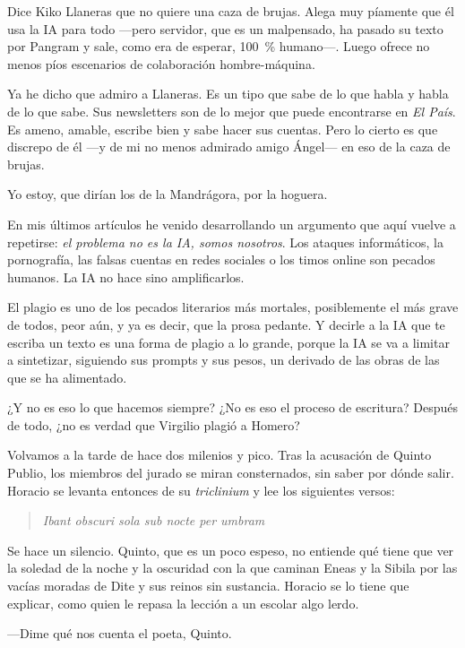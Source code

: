 \documentclass[11pt,a4paper]{article}
\begin{document}
Dice Kiko Llaneras que no quiere una caza de brujas. Alega muy píamente que él usa la IA para todo ---pero servidor, que es un malpensado, ha pasado su texto por Pangram y sale, como era de esperar, 100~\% humano---. Luego ofrece no menos píos escenarios de colaboración hombre-máquina.

Ya he dicho que admiro a Llaneras. Es un tipo que sabe de lo que habla y habla de lo que sabe. Sus newsletters son de lo mejor que puede encontrarse en \emph{El País}. Es ameno, amable, escribe bien y sabe hacer sus cuentas. Pero lo cierto es que discrepo de él ---y de mi no menos admirado amigo Ángel--- en eso de la caza de brujas.

Yo estoy, que dirían los de la Mandrágora, por la hoguera.

En mis últimos artículos he venido desarrollando un argumento que aquí vuelve a repetirse: \emph{el problema no es la IA, somos nosotros}. Los ataques informáticos, la pornografía, las falsas cuentas en redes sociales o los timos online son pecados humanos. La IA no hace sino amplificarlos.

El plagio es uno de los pecados literarios más mortales, posiblemente el más grave de todos, peor aún, y ya es decir, que la prosa pedante. Y decirle a la IA que te escriba un texto es una forma de plagio a lo grande, porque la IA se va a limitar a sintetizar, siguiendo sus prompts y sus pesos, un derivado de las obras de las que se ha alimentado.

¿Y no es eso lo que hacemos siempre? ¿No es eso el proceso de escritura? Después de todo, ¿no es verdad que Virgilio plagió a Homero?

Volvamos a la tarde de hace dos milenios y pico. Tras la acusación de Quinto Publio, los miembros del jurado se miran consternados, sin saber por dónde salir. Horacio se levanta entonces de su \emph{triclinium} y lee los siguientes versos:

\begin{verse}
\emph{Ibant obscuri sola sub nocte per umbram}
\end{verse}

Se hace un silencio. Quinto, que es un poco espeso, no entiende qué tiene que ver la soledad de la noche y la oscuridad con la que caminan Eneas y la Sibila por las vacías moradas de Dite y sus reinos sin sustancia. Horacio se lo tiene que explicar, como quien le repasa la lección a un escolar algo lerdo.

---Dime qué nos cuenta el poeta, Quinto.
\end{document}
